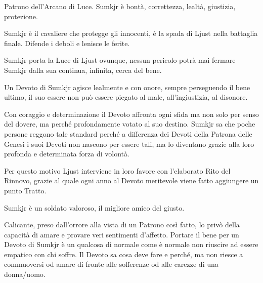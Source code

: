 \begin{multicols}{2}
Patrono dell'Arcano di Luce. Sumkjr è bontà, correttezza, lealtà, giustizia, protezione.

Sumkjr è il cavaliere che protegge gli innocenti, è la spada di Ljust nella battaglia finale. Difende i deboli e lenisce le ferite.

Sumkjr porta la Luce di Ljust ovunque, nessun pericolo potrà mai fermare Sumkjr dalla sua continua, infinita, cerca del bene.

Un Devoto di Sumkjr agisce lealmente e con onore, sempre perseguendo il bene ultimo, il suo essere non può essere piegato al male, all'ingiustizia, al disonore.

Con coraggio e determinazione il Devoto affronta ogni sfida ma non solo per senso del dovere, ma perché profondamente votato al suo destino. Sumkjr sa che poche persone reggono tale standard perché a differenza dei Devoti della Patrona delle Genesi i suoi Devoti non nascono per essere tali, ma lo diventano grazie alla loro profonda e determinata forza di volontà.

Per questo motivo Ljust interviene in loro favore con l'elaborato Rito del Rinnovo, grazie al quale ogni anno al Devoto meritevole viene fatto aggiungere un punto Tratto.

Sumkjr è un soldato valoroso, il migliore amico del giusto.

Calicante, preso dall'orrore alla vista di un Patrono così fatto, lo privò della capacità di amare e provare veri sentimenti d'affetto. Portare il bene per un Devoto di Sumkjr è un qualcosa di normale come è normale non riuscire ad essere empatico con chi soffre. Il Devoto sa cosa deve fare e perché, ma non riesce a commuoversi od amare di fronte alle sofferenze od alle carezze di una donna/uomo.


\end{multicols}

